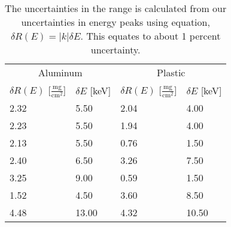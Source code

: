 \begin{table}[h] 
   \begin{center} 
      \begin{tabular}{llll}\toprule 
\multicolumn{2}{c}{Aluminum} & \multicolumn{2}{c}{Plastic}\\ 
\cmidrule(r){1-2} 
\cmidrule(r){3-4} 
$\delta R(E)$ [$\frac{\text{mg}}{\text{cm}^2}$] & $\delta E$ [keV] & $\delta R(E)$ [$\frac{\text{mg}}{\text{cm}^2}$] & $\delta E$ [keV]\\ \midrule 
    2.32 &     5.50 &     2.04 &     4.00 \\ 
    2.23 &     5.50 &     1.94 &     4.00 \\ 
    2.13 &     5.50 &     0.76 &     1.50 \\ 
    2.40 &     6.50 &     3.26 &     7.50 \\ 
    3.25 &     9.00 &     0.59 &     1.50 \\ 
    1.52 &     4.50 &     3.60 &     8.50 \\ 
    4.48 &    13.00 &     4.32 &    10.50 \\ \bottomrule 
      \end{tabular} 
   \end{center}
\caption{The uncertainties in the range is calculated from our uncertainties in energy peaks using equation,\cite{093570275X} $\delta R(E) = |k| \delta E$. This equates to about 1 percent uncertainty.} 
\label{tab:uncertaintyConversion} 
\end{table} 
